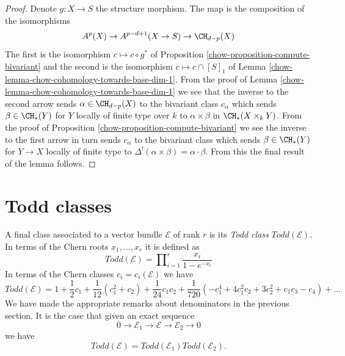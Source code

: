 \begin{proof}

Denote $g : X \to S$ the structure morphism.
The map is the composition of the isomorphisms
$$
A^p(X) \to A^{p - d + 1}(X \to S) \to \CH_{d - p}(X)
$$
The first is the isomorphism $c \mapsto c \circ g^*$ of
Proposition \ref{chow-proposition-compute-bivariant}
and the second is the isomorphism $c \mapsto c \cap [S]_1$ of
Lemma \ref{chow-lemma-chow-cohomology-towards-base-dim-1}.
From the proof of Lemma \ref{chow-lemma-chow-cohomology-towards-base-dim-1}
we see that the inverse to the second arrow sends $\alpha \in \CH_{d - p}(X)$
to the bivariant class $c_\alpha$ which sends $\beta \in \CH_*(Y)$
for $Y$ locally of finite type over $k$
to $\alpha \times \beta$ in $\CH_*(X \times_k Y)$. From the proof of
Proposition \ref{chow-proposition-compute-bivariant} we see the inverse
to the first arrow in turn sends $c_\alpha$ to the bivariant class
which sends $\beta \in \CH_*(Y)$ for $Y \to X$ locally of finite type
to $\Delta^!(\alpha \times \beta) = \alpha \cdot \beta$.
From this the final result of the lemma follows.
\end{proof}

\section{Todd classes}
\label{chow-section-todd-classes}
A final class associated to a vector bundle $\mathcal{E}$
of rank $r$ is its {\it Todd class} $Todd(\mathcal{E})$.
In terms of the Chern roots $x_1, \ldots, x_r$ it is
defined as
$$
Todd(\mathcal{E})
=
\prod\nolimits_{i = 1}^r
\frac{x_i}{1 - e^{-x_i}}
$$
In terms of the Chern classes $c_i = c_i(\mathcal{E})$
we have
$$
Todd(\mathcal{E})
=
1
+
\frac{1}{2}c_1
+
\frac{1}{12}(c_1^2 + c_2)
+
\frac{1}{24}c_1c_2
+
\frac{1}{720}(-c_1^4 + 4c_1^2c_2 + 3c_2^2 + c_1c_3 - c_4)
+
\ldots
$$
We have made the appropriate remarks about denominators
in the previous section. It is the case that
given an exact sequence
$$
0
\to
{\mathcal E}_1
\to
{\mathcal E}
\to
{\mathcal E}_2
\to
0
$$
we have
$$
Todd({\mathcal E}) = Todd({\mathcal E}_1) Todd({\mathcal E}_2).
$$

